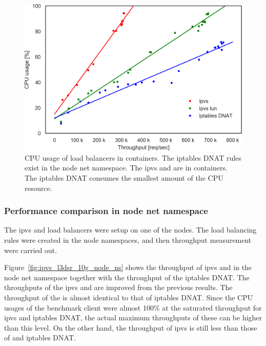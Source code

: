 \begin{figure}[h]
  \centering
  \includegraphics[width=0.8\columnwidth]{Figs/cpu_usage_10g}
  \par\bigskip
  \centering
  \begin{minipage}{0.9\columnwidth}
    \caption[CPU usage of load balancers in containers]{
      CPU usage of load balancers in containers.
      The iptables DNAT rules exist in the node net namespace.
      The ipvs and  are in containers.
      The iptables DNAT consumes the smallest amount of the CPU resource.
    }
    \label{fig:cpu_usage_10g}
  \end{minipage}
\end{figure}

\FloatBarrier

\subsubsection{Performance comparison in node net namespace}

The ipvs and  load balancers were setup on one of the nodes. 
The load balancing rules were created in the node namespaces, and then throughput measurement were carried out.

Figure~\ref{fig:ipvs_l3dsr_10g_node_ns} shows the throughput of ipvs and  in the node net namespace together with the throughput of the iptables DNAT.
The throughputs of the ipvs and  are improved from the previous results.
The throughput of the  is almost identical to that of iptables DNAT.
Since the CPU usages of the benchmark client were almost 100\% at the saturated throughput for ipvs and iptables DNAT, the actual maximum throughputs of these can be higher than this level.
On the other hand, the throughput of ipvs is still less than those of  and iptables DNAT.

